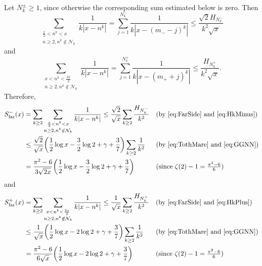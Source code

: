 \documentclass[10pt,reqno]{amsart}
\theoremstyle{plain}
\theoremstyle{definition}
\newcommand{\NN}{\mathcal{N}}
\begin{document}
Let $N_k^{\pm} \geq 1$, since otherwise the corresponding sum estimated below is zero.  Then
\begin{equation}\label{eq:HkMinus}
    \sum_{ \substack{\frac{x}{2} < n^k < x  \\ n \geq 2, n^k \notin \NN_k}}  \frac{1}{ k | x-n^k |}
    = \sum_{j=1}^{N^-_k}  \frac{1}{k |x-(m_- - j)^k|}
    \leq \frac{\sqrt{2}H_{N^-_k} }{k^2 \sqrt{x}}  
\end{equation}
and
\begin{equation}\label{eq:HkPlus}
    \sum_{\substack{x < n^k < \tfrac{3x}{2}  \\ n \geq 2, n^k \notin \NN_k}}  \frac{1}{ k | x-n^k |}
    = \sum_{j=1}^{N^+_k}  \frac{1}{k |x-(m_+ + j)^k|}
    \leq \frac{H_{N^+_k}}{k^2 \sqrt{x}}  .
\end{equation}
Therefore,
\begin{align}
S_{\text{far}}^-(x)
&=\sum_{k\geq 2} \sum_{ \substack{ \frac{x}{2} < n^k < x  \\ n \geq 2, n^k \notin \NN_k}}  \frac{1}{ k | x-n^k |} 
\leq  \frac{\sqrt{2}}{\sqrt{x}} \sum_{k\geq 2}\frac{H_{N^-_k} }{k^2 }  && (\text{by \eqref{eq:FarSide} and \eqref{eq:HkMinus}}) \nonumber\\
&\leq \frac{\sqrt{2}}{\sqrt{x}}   \bigg(\frac{1}{2}\log{x} - \frac{3}{2}\log{2} + \gamma + \frac{3}{7} \bigg) \sum_{k\geq 2}\frac{1}{k^2}
&& (\text{by \eqref{eq:TothMare} and \eqref{eq:GGNN}}) \nonumber \\
&=\frac{\pi^2-6}{3\sqrt{2 x}}  \bigg(\frac{1}{2}\log{x} - \frac{3}{2}\log{2} + \gamma + \frac{3}{7} \bigg) 
&&(\text{since $\zeta(2)-1 = \tfrac{\pi^2-6}{6}$}) \label{eq:FarMinus}
\end{align}
and
\begin{align}
S_{\text{far}}^+(x)
&=\sum_{k\geq 2}  \sum_{ \substack{ x < n^k < \frac{3x}{2} \\ n \geq 2, n^k \notin \NN_k}}   \frac{1}{ k | x-n^k |}
\leq \frac{1}{ \sqrt{x}}  \sum_{k \geq 2} \frac{H_{N^+_k}}{k^2} && (\text{by \eqref{eq:FarSide} and \eqref{eq:HkPlus}}) \nonumber\\
&\leq \frac{1}{ \sqrt{x}}  \bigg(\frac{1}{2}\log{x} - 2\log{2} + \gamma + \frac{3}{7} \bigg) \sum_{k \geq 2} \frac{1}{k^2}
&& (\text{by \eqref{eq:TothMare} and \eqref{eq:GGNN}}) \nonumber \\
&= \frac{\pi^2-6}{6\sqrt{x}}  \bigg(\frac{1}{2}\log{x} - 2\log{2} + \gamma + \frac{3}{7} \bigg) 
&&(\text{since $\zeta(2)-1 = \tfrac{\pi^2-6}{6}$}) \label{eq:FarPlus}
\end{align}
\end{document}
